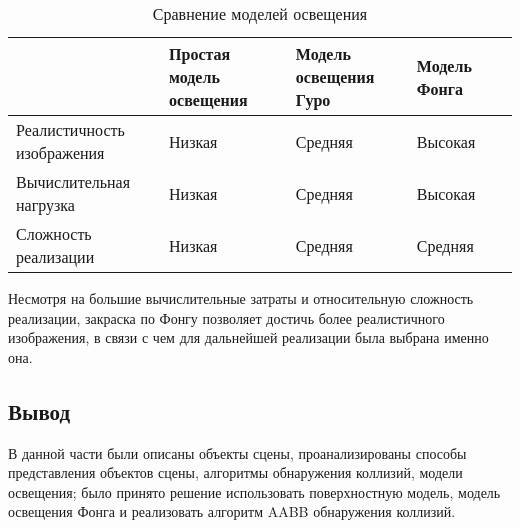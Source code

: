 \noindent
\begin{table}[H]
    \caption{Сравнение моделей освещения}
    \label{tab:lighting-models}
\begin{adjustbox}{width=1\textwidth}
    \begin{tabular}{|p{}|p{}|p{}|p{}|p{}|}
        \hline
        &
        Простая модель освещения
        &
        Модель освещения Гуро
        &
        Модель Фонга
        \\
        \hline
        Реалистичность изображения
        &
        Низкая
        &
        Средняя
        &
        Высокая
        \\
        \hline
        Вычислительная нагрузка
        &
        Низкая
        &
        Средняя
        &
        Высокая
        \\
        \hline
        Сложность реализации
        &
        Низкая
        &
        Средняя
        &
        Средняя
        \\
        \hline
    \end{tabular}
\end{adjustbox}
\end{table}

Несмотря на большие вычислительные затраты и относительную сложность реализации, закраска по Фонгу позволяет достичь более реалистичного изображения, в связи с чем для дальнейшей реализации была выбрана именно она.

\subsection{Вывод}

В данной части были описаны объекты сцены, проанализированы способы представления объектов сцены, алгоритмы обнаружения коллизий, модели освещения; было принято решение использовать поверхностную модель, модель освещения Фонга и реализовать алгоритм AABB обнаружения коллизий.
